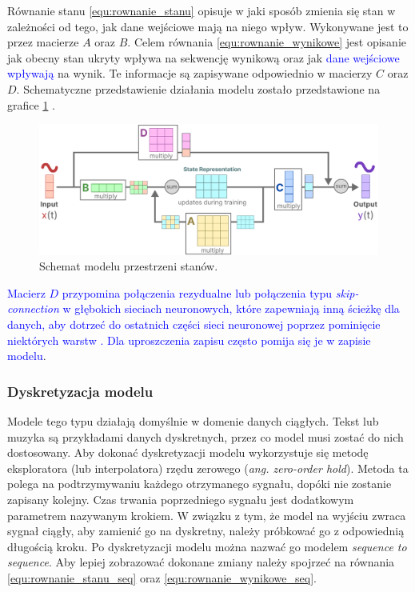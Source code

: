 \documentclass[data-science]{agh-wi} %
\begin{document}
Równanie stanu \ref*{equ:rownanie_stanu} opisuje w jaki sposób zmienia się stan w zależności od tego, jak dane wejściowe mają na niego wpływ. Wykonywane jest to przez macierze $A$ oraz $B$. Celem równania \ref*{equ:rownanie_wynikowe} jest opisanie jak obecny stan ukryty wpływa na sekwencję wynikową oraz jak \textcolor{blue}{dane wejściowe wpływają} na wynik. Te informacje są zapisywane odpowiednio w macierzy $C$ oraz $D$. Schematyczne przedstawienie działania modelu zostało przedstawione na grafice \ref*{fig:ssm_scheme} \cite*{mamba_guide}.

\begin{figure}[ht!]
    \begin{center}
        \includegraphics[width=0.9\linewidth]{./img/SSM_scheme.png}
    \end{center}
    \caption{Schemat modelu przestrzeni stanów.}\label{fig:ssm_scheme}
\end{figure}

\textcolor{blue}{Macierz $D$ przypomina połączenia rezydualne lub połączenia typu \textit{skip-connection} w głębokich sieciach neuronowych, które zapewniają inną ścieżkę dla danych, aby dotrzeć do ostatnich części sieci neuronowej poprzez pominięcie niektórych warstw \cite{resnet}. Dla uproszczenia zapisu często pomija się je w zapisie modelu}.

\subsubsection*{Dyskretyzacja modelu}
Modele tego typu działają domyślnie w domenie danych ciągłych. Tekst lub muzyka są przykładami danych dyskretnych, przez co model musi zostać do nich dostosowany. Aby dokonać dyskretyzacji modelu wykorzystuje się metodę eksploratora (lub interpolatora) rzędu zerowego (\textit{ang. zero-order hold}). Metoda ta polega na podtrzymywaniu każdego otrzymanego sygnału, dopóki nie zostanie zapisany kolejny. Czas trwania poprzedniego sygnału jest dodatkowym parametrem nazywanym krokiem. W związku z tym, że model na wyjściu zwraca sygnał ciągły, aby zamienić go na dyskretny, należy próbkować go z odpowiednią długością kroku. Po dyskretyzacji modelu można nazwać go modelem \textit{sequence to sequence}. Aby lepiej zobrazować dokonane zmiany należy spojrzeć na równania \ref*{equ:rownanie_stanu_seq} oraz \ref*{equ:rownanie_wynikowe_seq}.
\end{document}
